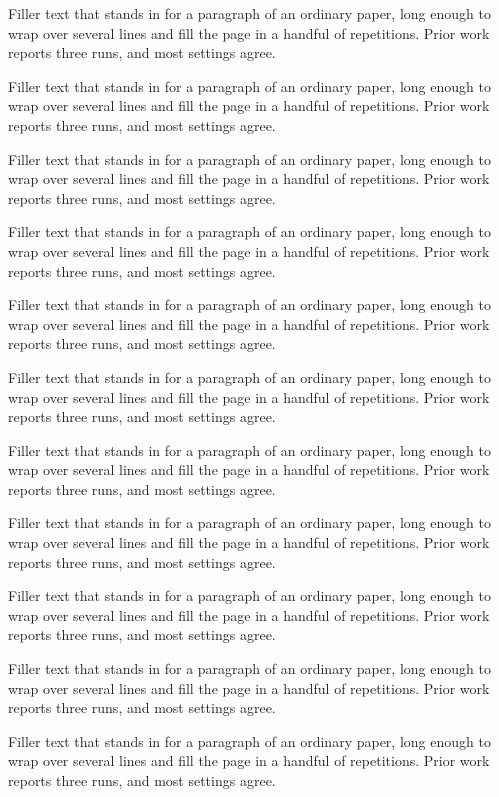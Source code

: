 \documentclass{article}
\begin{document}
Filler text that stands in for a paragraph of an ordinary paper, long enough to wrap over several lines and fill the page in a handful of repetitions. Prior work reports three runs, and most settings agree.\par
Filler text that stands in for a paragraph of an ordinary paper, long enough to wrap over several lines and fill the page in a handful of repetitions. Prior work reports three runs, and most settings agree.\par
Filler text that stands in for a paragraph of an ordinary paper, long enough to wrap over several lines and fill the page in a handful of repetitions. Prior work reports three runs, and most settings agree.\par
Filler text that stands in for a paragraph of an ordinary paper, long enough to wrap over several lines and fill the page in a handful of repetitions. Prior work reports three runs, and most settings agree.\par
Filler text that stands in for a paragraph of an ordinary paper, long enough to wrap over several lines and fill the page in a handful of repetitions. Prior work reports three runs, and most settings agree.\par
Filler text that stands in for a paragraph of an ordinary paper, long enough to wrap over several lines and fill the page in a handful of repetitions. Prior work reports three runs, and most settings agree.\par
Filler text that stands in for a paragraph of an ordinary paper, long enough to wrap over several lines and fill the page in a handful of repetitions. Prior work reports three runs, and most settings agree.\par
Filler text that stands in for a paragraph of an ordinary paper, long enough to wrap over several lines and fill the page in a handful of repetitions. Prior work reports three runs, and most settings agree.\par
Filler text that stands in for a paragraph of an ordinary paper, long enough to wrap over several lines and fill the page in a handful of repetitions. Prior work reports three runs, and most settings agree.\par
Filler text that stands in for a paragraph of an ordinary paper, long enough to wrap over several lines and fill the page in a handful of repetitions. Prior work reports three runs, and most settings agree.\par
Filler text that stands in for a paragraph of an ordinary paper, long enough to wrap over several lines and fill the page in a handful of repetitions. Prior work reports three runs, and most settings agree.\par
\end{document}
